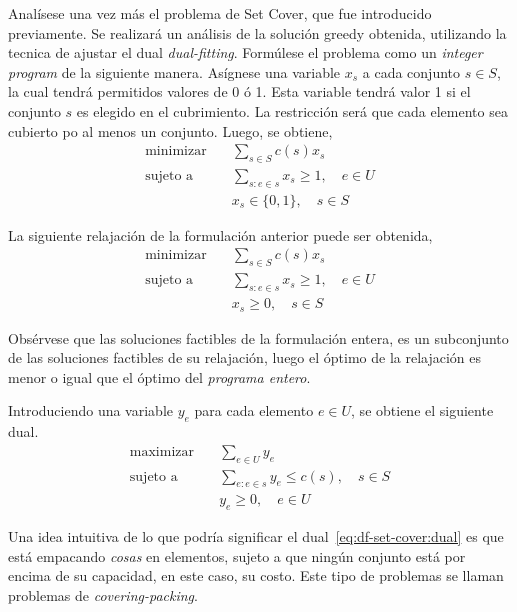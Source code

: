 \documentclass[../np-approximations.tex]{subfiles}
\begin{document}
Analísese una vez más el problema de Set Cover, que fue introducido previamente. Se realizará un análisis de la solución greedy obtenida, utilizando la tecnica de ajustar el dual \emph{dual-fitting}. Formúlese el problema como un \emph{integer program} de la siguiente manera. Asígnese una variable $x_s$ a cada conjunto $s\in S$, la cual tendrá permitidos valores de 0 ó 1. Esta variable tendrá valor 1 si el conjunto $s$ es elegido en el cubrimiento. La restricción será que cada elemento sea cubierto po al menos un conjunto. Luego, se obtiene,
\begin{equation}
	\label{eq:df-set-cover:primal}
	\begin{split}
		\text{minimizar}\quad & \sum_{s\in S} c(s)x_s \\
		\text{sujeto a}\quad  & \sum_{s: e\in s} x_s \ge 1,\quad e\in U \\
		& x_s \in \{0,1\},\quad s\in S
	\end{split}
\end{equation}

La siguiente relajación de la formulación anterior puede ser obtenida,
\begin{equation}
	\label{eq:df-set-cover:relaxed}
	\begin{split}
		\text{minimizar}\quad & \sum_{s\in S} c(s)x_s \\
		\text{sujeto a}\quad  & \sum_{s: e\in s} x_s \ge 1,\quad e\in U \\
		& x_s \ge 0,\quad s\in S
	\end{split}
\end{equation}

Obsérvese que las soluciones factibles de la formulación entera, es un subconjunto de las soluciones factibles de su relajación, luego el óptimo de la relajación es menor o igual que el óptimo del \emph{programa entero}.

Introduciendo una variable $y_e$ para cada elemento $e\in U$, se obtiene el siguiente dual.
\begin{equation}
	\label{eq:df-set-cover:dual}
	\begin{split}
		\text{maximizar}\quad & \sum_{e\in U} y_e \\
		\text{sujeto a}\quad  & \sum_{e: e\in s} y_e \le c(s),\quad s\in S \\
		& y_e \ge 0,\quad e\in U
	\end{split}
\end{equation}

Una idea intuitiva de lo que podría significar el dual~\eqref{eq:df-set-cover:dual} es que está empacando \emph{cosas} en elementos, sujeto a que ningún conjunto está por encima de su capacidad, en este caso, su costo. Este tipo de problemas se llaman problemas de \emph{covering-packing}.
\end{document}
